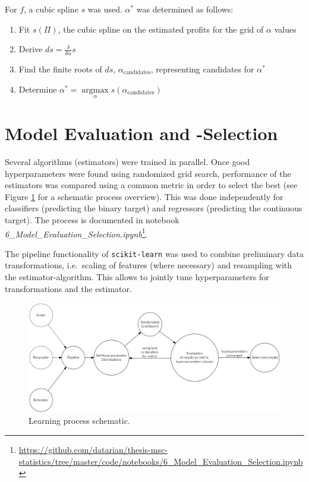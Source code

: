 \documentclass[
  11pt,
  a4paper,
  DIV=12,captions=tableheading,oneside,titlepage]{scrbook}
\providecommand{\tightlist}{%
  \setlength{\itemsep}{0pt}\setlength{\parskip}{0pt}}
\begin{document}
For \(f\), a cubic spline \(s\) was used. \(\alpha^*\) was determined as follows:

\begin{enumerate}
\def\labelenumi{\arabic{enumi}.}
\tightlist
\item
  Fit \(s(\Pi)\), the cubic spline on the estimated profits for the grid of \(\alpha\) values
\item
  Derive \(ds = \frac{\delta}{\delta \alpha} s\)
\item
  Find the finite roots of \(ds\), \(\alpha_{\text{candidates}}\), representing candidates for \(\alpha^*\)
\item
  Determine \(\alpha^* = \underset{\alpha}{\operatorname{argmax}} s(\alpha_{\text{candidates}})\)
\end{enumerate}

\hypertarget{eval-and-select}{%
\section{Model Evaluation and -Selection}\label{eval-and-select}}

Several algorithms (estimators) were trained in parallel. Once good hyperparameters were found using randomized grid search, performance of the estimators was compared using a common metric in order to select the best (see Figure \ref{fig:evaluation-selection} for a schematic process overview). This was done independently for classifiers (predicting the binary target) and regressors (predicting the continuous target). The process is documented in notebook \emph{6\_Model\_Evaluation\_Selection.ipynb}\footnote{\url{https://github.com/datarian/thesis-msc-statistics/tree/master/code/notebooks/6_Model_Evaluation_Selection.ipynb}}.

The pipeline functionality of \texttt{scikit-learn} was used to combine preliminary data transformations, i.e.~scaling of features (where necessary) and resampling with the estimator-algorithm. This allows to jointly tune hyperparameters for transformations and the estimator.

\begin{figure}

{\centering \includegraphics[width=0.8\linewidth]{figures/methods/evaluation-process} 

}

\caption{Learning process schematic.}\label{fig:evaluation-selection}
\end{figure}
\end{document}

